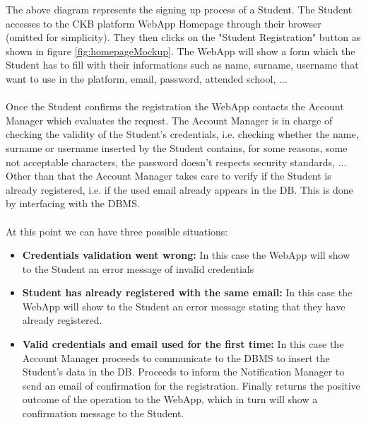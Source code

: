 \documentclass{article}
\begin{document}
{        The above diagram represents the signing up process of a Student.
        The Student accesses to the CKB platform WebApp Homepage through their browser
        (omitted for simplicity). They then clicks on the "Student Registration" button as
        shown in figure \ref{fig:homepageMockup}. The WebApp will show a form
        which the Student has to fill with their informations such as
        name, surname, username that want to use in the platform, email,
        password, attended school, ... 
        \\ \\
        Once the Student confirms the registration the WebApp contacts the
        Account Manager which evaluates the request.
        The Account Manager is in charge of checking the validity of the Student's credentials,
        i.e. checking whether the name, surname or username inserted by the Student
        contains, for some reasons, some not acceptable characters, the password
        doesn't respects security standards, ... \\
        Other than that the Account Manager takes care to verify if the Student is already
        registered, i.e. if the used email already appears in the DB. This is done by interfacing
        with the DBMS.
        \\ \\
        At this point we can have three possible situations:
        \begin{itemize}
            \item \textbf{Credentials validation went wrong:} In this case the WebApp will show to the
            Student an error message of invalid credentials
            \item \textbf{Student has already registered with the same email:} In this case the WebApp will show to the
            Student an error message stating that they have already registered.
            \item \textbf{Valid credentials and email used for the first time:} In this case the Account
            Manager proceeds to communicate to the DBMS to insert the Student's data in the DB.
            Proceeds to inform the Notification Manager to send an email of confirmation for the registration.
            Finally returns the positive outcome of the operation to the WebApp, which in 
            turn will show a confirmation message to the Student.
        \end{itemize}

    \newpage
}
\end{document}

